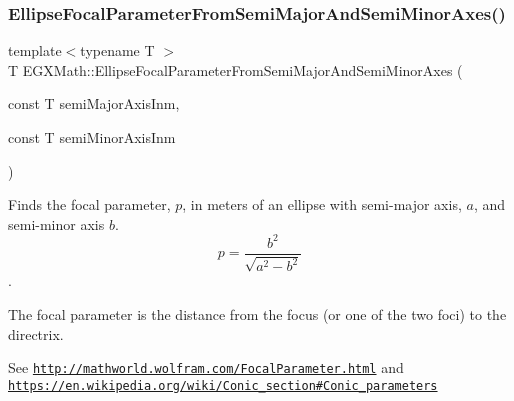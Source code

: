 \subsubsection{\texorpdfstring{Ellipse\+Focal\+Parameter\+From\+Semi\+Major\+And\+Semi\+Minor\+Axes()}{EllipseFocalParameterFromSemiMajorAndSemiMinorAxes()}}
{\footnotesize\ttfamily template$<$typename T $>$ \\
T E\+G\+X\+Math\+::\+Ellipse\+Focal\+Parameter\+From\+Semi\+Major\+And\+Semi\+Minor\+Axes (\begin{DoxyParamCaption}\item[{const T}]{semi\+Major\+Axis\+Inm,  }\item[{const T}]{semi\+Minor\+Axis\+Inm }\end{DoxyParamCaption})}



Finds the focal parameter, $p$, in meters of an ellipse with semi-\/major axis, $a$, and semi-\/minor axis $b$. \[ p=\frac{b^2}{\sqrt{a^2-b^2}} \]. 

The focal parameter is the distance from the focus (or one of the two foci) to the directrix.

See \href{http://mathworld.wolfram.com/FocalParameter.html}{\tt http\+://mathworld.\+wolfram.\+com/\+Focal\+Parameter.\+html} and \href{https://en.wikipedia.org/wiki/Conic_section#Conic_parameters}{\tt https\+://en.\+wikipedia.\+org/wiki/\+Conic\+\_\+section\#\+Conic\+\_\+parameters}


